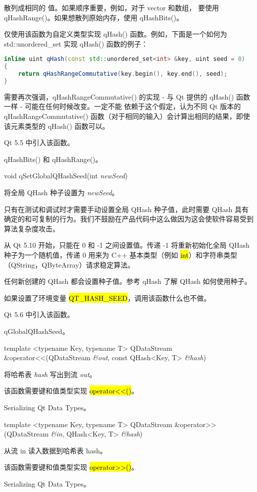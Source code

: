 散列成相同的 值。如果顺序重要，例如，对于 vector 和数组， 要使用 qHashRange()。如果想散列原始内存，使用 qHashBits()。

仅使用该函数为自定义类型实现 qHash() 函数。例如，下面是一个如何为
std::unordered\_set 实现 qHash() 函数的例子：

\begin{lstlisting}[language=C++]
inline uint qHash(const std::unordered_set<int> &key, uint seed = 0)
{
    return qHashRangeCommutative(key.begin(), key.end(), seed);
}
\end{lstlisting}

需要再次强调，qHashRangeCommutative() 的实现 - 与 Qt 提供的 qHash() 函数一样 - 可能在任何时候改变。一定不能 依赖于这个假定，认为不同 Qt 版本的 qHashRangeCommutative() 函数（对于相同的输入）会计算出相同的结果，即使该元素类型的 qHash() 函数可以。

Qt 5.5 中引入该函数。

\begin{seeAlso}
qHashBits() 和 qHashRange()。
\end{seeAlso}

void qSetGlobalQHashSeed(int \emph{newSeed})

将全局 QHash 种子设置为 \emph{newSeed}。

只有在测试和调试时才需要手动设置全局 QHash 种子值，此时需要 QHash 具有确定的和可复制的行为。我们不鼓励在产品代码中这么做因为这会使软件容易受到 算法复杂度攻击。

从 Qt 5.10 开始，只能在 0 和 -1 之间设置值。传递 -1 将重新初始化全局 QHash 种子为一个随机值，传递 0 用来为 C++ 基本类型（例如 \hl{int}）和字符串类型（QString，QByteArray）请求稳定算法。

任何新创建的 QHash 都会设置种子值。参考 qHash 了解 QHash 如何使用种子。

如果设置了环境变量 \hl{QT\_HASH\_SEED}，调用该函数什么也不做。

Qt 5.6 中引入该函数。

\begin{seeAlso}
qGlobalQHashSeed。
\end{seeAlso}

template <typename Key, typename T> QDataStream \&operator<<(QDataStream \emph{\&out}, const QHash<Key, T> \emph{\&hash})

将哈希表 \emph{hash} 写出到流 \emph{out}。

该函数需要键和值类型实现 \hl{operator<<()}。

\begin{seeAlso}
Serializing Qt Data Types。
\end{seeAlso}

template <typename Key, typename T> QDataStream \&operator>>(QDataStream \emph{\&in}, QHash<Key, T> \emph{\&hash})

从流 in 读入数据到哈希表 hash。

该函数需要键和值类型实现 \hl{operator>>()}。

\begin{seeAlso}
Serializing Qt Data Types。
\end{seeAlso}